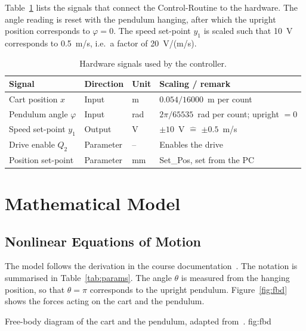 Table~\ref{tab:signals} lists the signals that connect the Control-Routine to
the hardware. The angle reading is reset with the pendulum hanging, after
which the upright position corresponds to $\varphi = 0$. The speed set-point
$y_1$ is scaled such that 10~V corresponds to 0.5~m/s, i.e.\ a factor of
20~V/(m/s).

\begin{table}[ht]
\centering
\caption{Hardware signals used by the controller.}
\label{tab:signals}
\begin{tabular}{llll}
\toprule
Signal & Direction & Unit & Scaling / remark \\
\midrule
Cart position $x$ & Input & m & $0.054/16000$~m per count \\
Pendulum angle $\varphi$ & Input & rad & $2\pi/65535$~rad per count; upright $= 0$ \\
Speed set-point $y_1$ & Output & V & $\pm 10$~V $\hat{=}$ $\pm 0.5$~m/s \\
Drive enable $Q_2$ & Parameter & -- & Enables the drive \\
Position set-point & Parameter & mm & Set\_Pos, set from the PC \\
\bottomrule
\end{tabular}
\end{table}

\section{Mathematical Model}
\label{sec:model}

\subsection{Nonlinear Equations of Motion}
\label{subsec:nonlinear}

The model follows the derivation in the course documentation~\cite{ln_manual}.
The notation is summarised in Table~\ref{tab:params}. The angle $\theta$ is
measured from the hanging position, so that $\theta = \pi$ corresponds to the
upright pendulum. Figure~\ref{fig:fbd} shows the forces acting on the cart and
the pendulum.

  {Free-body diagram of the cart and the pendulum, adapted from~\cite{ln_manual}.}
  {fig:fbd}

